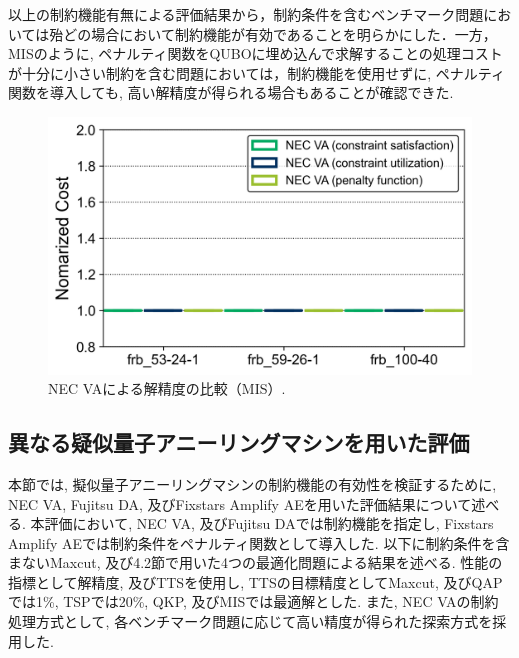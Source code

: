 \documentclass[submit,techrep,noauthor]{ipsj}
\begin{document}
以上の制約機能有無による評価結果から，制約条件を含むベンチマーク問題においては殆どの場合において制約機能が有効であることを明らかにした．一方，MISのように, ペナルティ関数をQUBOに埋め込んで求解することの処理コストが十分に小さい制約を含む問題においては，制約機能を使用せずに, ペナルティ関数を導入しても, 高い解精度が得られる場合もあることが確認できた.

\begin{figure}[tb]
\centering
\includegraphics[bb=0 0 700 230, width=15cm]{Cost_MIS_VA.png}
\caption{NEC VAによる解精度の比較（MIS）.}
\label{Cost_MIS_VA}
\end{figure}


\subsection{異なる疑似量子アニーリングマシンを用いた評価}
本節では, 擬似量子アニーリングマシンの制約機能の有効性を検証するために, NEC VA, Fujitsu DA, 及びFixstars Amplify AEを用いた評価結果について述べる. 本評価において, NEC VA, 及びFujitsu DAでは制約機能を指定し, Fixstars Amplify AEでは制約条件をペナルティ関数として導入した. 以下に制約条件を含まないMaxcut, 及び4.2節で用いた4つの最適化問題による結果を述べる. 性能の指標として解精度, 及びTTSを使用し, TTSの目標精度としてMaxcut, 及びQAPでは1\%, TSPでは20\%, QKP, 及びMISでは最適解とした. また, NEC VAの制約処理方式として, 各ベンチマーク問題に応じて高い精度が得られた探索方式を採用した.
\end{document}
